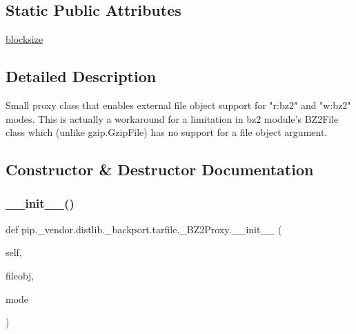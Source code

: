 \subsection*{Static Public Attributes}
\begin{DoxyCompactItemize}
\item 
\hyperlink{classpip_1_1__vendor_1_1distlib_1_1__backport_1_1tarfile_1_1__BZ2Proxy_a373feeadcbfbe92f18e5dbfd1be03bde}{blocksize}
\end{DoxyCompactItemize}


\subsection{Detailed Description}
\begin{DoxyVerb}Small proxy class that enables external file object
   support for "r:bz2" and "w:bz2" modes. This is actually
   a workaround for a limitation in bz2 module's BZ2File
   class which (unlike gzip.GzipFile) has no support for
   a file object argument.
\end{DoxyVerb}
 

\subsection{Constructor \& Destructor Documentation}
\mbox{\label{classpip_1_1__vendor_1_1distlib_1_1__backport_1_1tarfile_1_1__BZ2Proxy_af733db683932ab0756b7b94f531eb356}} 
\subsubsection{\texorpdfstring{\+\_\+\+\_\+init\+\_\+\+\_\+()}{\_\_init\_\_()}}
{\footnotesize\ttfamily def pip.\+\_\+vendor.\+distlib.\+\_\+backport.\+tarfile.\+\_\+\+B\+Z2\+Proxy.\+\_\+\+\_\+init\+\_\+\+\_\+ (\begin{DoxyParamCaption}\item[{}]{self,  }\item[{}]{fileobj,  }\item[{}]{mode }\end{DoxyParamCaption})}



